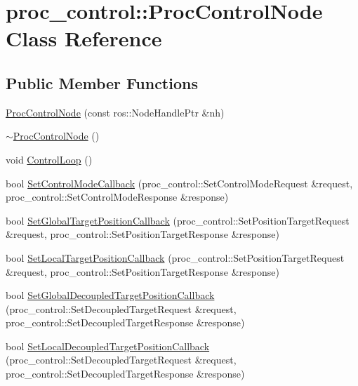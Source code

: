 \hypertarget{classproc__control_1_1_proc_control_node}{}\section{proc\+\_\+control\+:\+:Proc\+Control\+Node Class Reference}
\label{classproc__control_1_1_proc_control_node}
\subsection*{Public Member Functions}
\begin{DoxyCompactItemize}
\item 
\hyperlink{classproc__control_1_1_proc_control_node_a3990253ca2e924c15e25cecba4297359}{Proc\+Control\+Node} (const ros\+::\+Node\+Handle\+Ptr \&nh)
\item 
\hyperlink{classproc__control_1_1_proc_control_node_ac4ec58d30c4c8a5842f1797154b6e363}{$\sim$\+Proc\+Control\+Node} ()
\item 
void \hyperlink{classproc__control_1_1_proc_control_node_adc8a2178d41c620f69cb74c2f09097cd}{Control\+Loop} ()
\item 
bool \hyperlink{classproc__control_1_1_proc_control_node_ac56aa1e6e028c225be157371aba76d32}{Set\+Control\+Mode\+Callback} (proc\+\_\+control\+::\+Set\+Control\+Mode\+Request \&request, proc\+\_\+control\+::\+Set\+Control\+Mode\+Response \&response)
\item 
bool \hyperlink{classproc__control_1_1_proc_control_node_a7890db7144358d5aaf0daa7bfefed964}{Set\+Global\+Target\+Position\+Callback} (proc\+\_\+control\+::\+Set\+Position\+Target\+Request \&request, proc\+\_\+control\+::\+Set\+Position\+Target\+Response \&response)
\item 
bool \hyperlink{classproc__control_1_1_proc_control_node_ad331887883a3c1c44472d72dfced3db6}{Set\+Local\+Target\+Position\+Callback} (proc\+\_\+control\+::\+Set\+Position\+Target\+Request \&request, proc\+\_\+control\+::\+Set\+Position\+Target\+Response \&response)
\item 
bool \hyperlink{classproc__control_1_1_proc_control_node_a841b03177a02e542bf7f7aa8403c5382}{Set\+Global\+Decoupled\+Target\+Position\+Callback} (proc\+\_\+control\+::\+Set\+Decoupled\+Target\+Request \&request, proc\+\_\+control\+::\+Set\+Decoupled\+Target\+Response \&response)
\item 
bool \hyperlink{classproc__control_1_1_proc_control_node_a01301ec4fcd9e4d149994cbe27ff8ca1}{Set\+Local\+Decoupled\+Target\+Position\+Callback} (proc\+\_\+control\+::\+Set\+Decoupled\+Target\+Request \&request, proc\+\_\+control\+::\+Set\+Decoupled\+Target\+Response \&response)
\end{DoxyCompactItemize}
